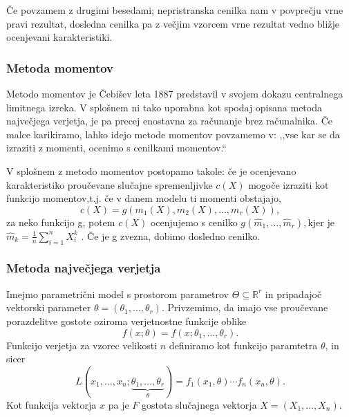 \documentclass[12pt,a4paper]{amsart}
\theoremstyle{definition} %
\theoremstyle{plain} %
\begin{document}
Če povzamem z drugimi besedami; nepristranska cenilka nam v povprečju vrne pravi rezultat, dosledna cenilka pa z večjim vzorcem vrne rezultat vedno
bližje ocenjevani karakteristiki.

\subsubsection{Metoda momentov}
Metodo momentov je Čebišev leta 1887 predstavil v svojem dokazu centralnega limitnega izreka. V splošnem ni tako uporabna kot spodaj opisana metoda največjega
verjetja, je pa precej enostavna za računanje brez računalnika. Če malce karikiramo, lahko idejo metode momentov povzamemo v:
,,vse kar se da izraziti z momenti, ocenimo s cenilkami momentov.``

V splošnem z metodo momentov postopamo takole: če je ocenjevano karakteristiko proučevane slučajne spremenljivke $c(X)$ mogoče izraziti kot funkcijo 
momentov,t.j. če v danem modelu ti momenti obstajajo, 
\[
    c(X) = g(m_{1}(X), m_{2}(X),\ldots,m_{r}(X)),
\] za neko funkcijo g, potem $c(X)$ ocenjujemo s cenilko $g(\hat{m}_{1},\ldots,\hat{m}_{r}), $kjer je $\hat{m}_{k} = \frac{1}{n}\sum_{i=1}^{n}X^{k}_{i}$ . Če je g zvezna, dobimo dosledno cenilko.

\subsubsection{Metoda največjega verjetja} %
Imejmo parametrični model s prostorom parametrov $\Theta \subseteq \mathbb{R}^{r}$ in pripadajoč vektorski parameter $\theta = (\theta_{1},\ldots,\theta_{r}).$
Privzemimo, da imajo vse proučevane porazdelitve gostote oziroma verjetnostne funkcije oblike
\[
    f(x;\theta) = f(x;\theta_{1},\ldots,\theta_{r}).
\]
Funkcijo verjetja za vzorec velikosti $n$ definiramo kot funkcijo paramtetra $\theta$, in sicer
\[
    L(x_{1},\ldots,x_{n};\underbrace{\theta_{1},\ldots,\theta_{r}}_{\theta}) = f_{1}(x_{1},\theta)\cdots f_{n}(x_{n},\theta).
\]
Kot funkcija vektorja $x$ pa je $F$ gostota slučajnega vektorja $X = (X_{1},\ldots,X_{n}).$
\end{document}
